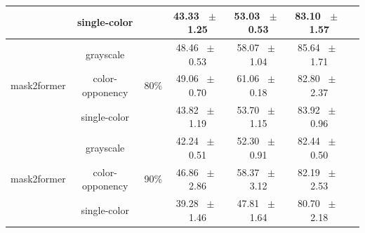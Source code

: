 \begin{table}[h]
\begin{tabular}{@{}lccc ccc@{}}
    & single-color & & 43.33 ~$\pm$~ 1.25 & 53.03 ~$\pm$~ 0.53 & 83.10 ~$\pm$~ 1.57 \\
    \midrule
    \multirow{3}{*}{mask2former} & grayscale & \multirow{3}{*}{80\%} & 48.46 ~$\pm$~ 0.53 & 58.07 ~$\pm$~ 1.04 & 85.64 ~$\pm$~ 1.71 \\
    & color-opponency & & 49.06 ~$\pm$~ 0.70 & 61.06 ~$\pm$~ 0.18 & 82.80 ~$\pm$~ 2.37 \\
    & single-color & & 43.82 ~$\pm$~ 1.19 & 53.70 ~$\pm$~ 1.15 & 83.92 ~$\pm$~ 0.96 \\
    \midrule
    \multirow{3}{*}{mask2former} & grayscale & \multirow{3}{*}{90\%} & 42.24 ~$\pm$~ 0.51 & 52.30 ~$\pm$~ 0.91 & 82.44 ~$\pm$~ 0.50 \\
    & color-opponency & & 46.86 ~$\pm$~ 2.86 & 58.37 ~$\pm$~ 3.12 & 82.19 ~$\pm$~ 2.53 \\
    & single-color & & 39.28 ~$\pm$~ 1.46 & 47.81 ~$\pm$~ 1.64 & 80.70 ~$\pm$~ 2.18 \\
    \midrule
    \bottomrule
  \end{tabular}
  \label{tab:sparse_mask2former_acdc_snow}
\end{table}
